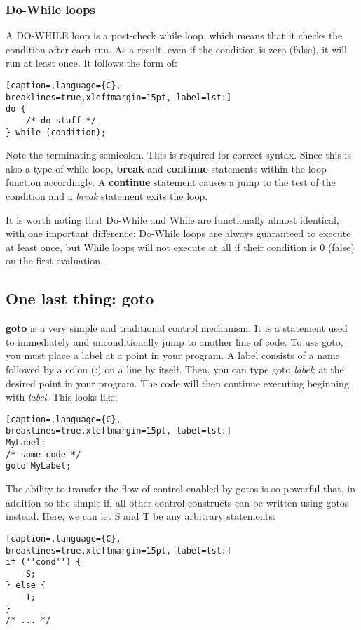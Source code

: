 \subsubsection{Do-While loops}
A DO-WHILE loop is a post-check while loop, which means that it checks the
condition after each run. As a result, even if the condition is zero (false),
it will run at least once. It follows the form of:
\lstset{basicstyle=\scriptsize, numbers=left, captionpos=b, tabsize=4}
\begin{lstlisting}[caption=,language={C},
breaklines=true,xleftmargin=15pt, label=lst:]
do {
	/* do stuff */
} while (condition);
\end{lstlisting}

Note the terminating semicolon. This is required for correct syntax. Since this
is also a type of while loop, \textbf{break} and \textbf{continue} statements
within the loop function accordingly. A \textbf{continue} statement causes a
jump to the test of the condition and a \emph{break} statement exits the loop.

It is worth noting that Do-While and While are functionally almost identical,
with one important difference: Do-While loops are always guaranteed to execute
at least once, but While loops will not execute at all if their condition is 0
(false) on the first evaluation.

\subsection{One last thing: goto}
\textbf{goto} is a very simple and traditional control mechanism. It is a
statement used to immediately and unconditionally jump to another line of code.
To use goto, you must place a label at a point in your program. A label
consists of a name followed by a colon (:) on a line by itself. Then, you can
type goto \emph{label}; at the desired point in your program. The code will
then continue executing beginning with \emph{label}. This looks like:
\lstset{basicstyle=\scriptsize, numbers=left, captionpos=b, tabsize=4}
\begin{lstlisting}[caption=,language={C},
breaklines=true,xleftmargin=15pt, label=lst:]
MyLabel:
/* some code */
goto MyLabel;
\end{lstlisting}

The ability to transfer the flow of control enabled by gotos is so powerful
that, in addition to the simple if, all other control constructs can be written
using gotos instead. Here, we can let S and T be any arbitrary
statements:
\lstset{basicstyle=\scriptsize, numbers=left, captionpos=b, tabsize=4}
\begin{lstlisting}[caption=,language={C},
breaklines=true,xleftmargin=15pt, label=lst:]
if (''cond'') {
	S;
} else {
	T;
}
/* ... */
\end{lstlisting}

